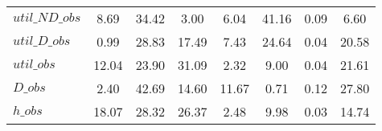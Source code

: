 \begin{center}
\begin{longtable}{lccccccc}
$util\_ND\_obs  $	 & 	         8.69	 & 	        34.42	 & 	         3.00	 & 	         6.04	 & 	        41.16	 & 	         0.09	 & 	         6.60 \\ 
$util\_D\_obs   $	 & 	         0.99	 & 	        28.83	 & 	        17.49	 & 	         7.43	 & 	        24.64	 & 	         0.04	 & 	        20.58 \\ 
$util\_obs      $	 & 	        12.04	 & 	        23.90	 & 	        31.09	 & 	         2.32	 & 	         9.00	 & 	         0.04	 & 	        21.61 \\ 
$D\_obs         $	 & 	         2.40	 & 	        42.69	 & 	        14.60	 & 	        11.67	 & 	         0.71	 & 	         0.12	 & 	        27.80 \\ 
$h\_obs         $	 & 	        18.07	 & 	        28.32	 & 	        26.37	 & 	         2.48	 & 	         9.98	 & 	         0.03	 & 	        14.74 \\ 
\end{longtable}
 \end{center}
